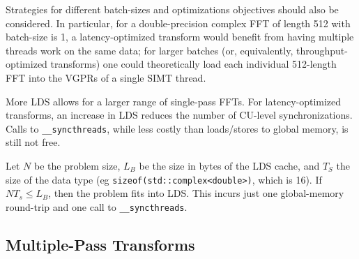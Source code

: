 \documentclass[blind]{gtac}
\begin{document}
Strategies for different batch-sizes and optimizations objectives
should also be considered.  In particular, for a double-precision
complex FFT of length 512 with batch-size is 1, a latency-optimized
transform would benefit from having multiple threads work on the same
data; for larger batches (or, equivalently, throughput-optimized
transforms) one could theoretically load each individual 512-length
FFT into the VGPRs of a single SIMT thread.

More LDS allows for a larger range of single-pass FFTs. For
latency-optimized transforms, an increase in LDS reduces the number of
CU-level synchronizations.  Calls to \texttt{__syncthreads}, while
less costly than loads/stores to global memory, is still not free.

Let $N$ be the problem size, $L_B$ be the size in bytes of the LDS
cache, and $T_S$ the size of the data type (eg
\texttt{sizeof(std::complex<double>)}, which is 16).  If $N T_s \leq
L_B$, then the problem fits into LDS.  This incurs just one
global-memory round-trip and one call to \texttt{__syncthreads}.



\subsection{Multiple-Pass Transforms}
\end{document}
